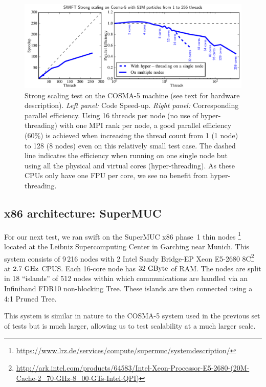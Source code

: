 \documentclass{sig-alternate-05-2015}
\newcommand{\swift}{{\sc swift}\xspace}
\begin{document}
\begin{figure}
\centering
\includegraphics[width=\textwidth]{Figures/scalingCosma}
\caption{Strong scaling test on the COSMA-5 machine (see text for hardware
  description). \textit{Left panel:} Code Speed-up. \textit{Right panel:}
  Corresponding parallel efficiency.  Using 16 threads per node (no use of
  hyper-threading) with one MPI rank per node, a good parallel efficiency (60\%)
  is achieved when increasing the thread count from 1 (1 node) to 128 (8 nodes)
  even on this relatively small test case. The dashed line indicates the
  efficiency when running on one single node but using all the physical and
  virtual cores (hyper-threading). As these CPUs only have one FPU per core, we
  see no benefit from hyper-threading.
  \label{fig:cosma}}
\end{figure}



\subsection{x86 architecture: SuperMUC}

For our next test, we ran \swift on the SuperMUC x86 phase~1 thin
nodes \footnote{\url{https://www.lrz.de/services/compute/supermuc/systemdescription/}}
located at the Leibniz Supercomputing Center in Garching near Munich. This
system consists of 9\,216 nodes with 2 Intel Sandy Bridge-EP Xeon E5-2680
8C\footnote{\url{http://ark.intel.com/products/64583/Intel-Xeon-Processor-E5-2680-(20M-Cache-2_70-GHz-8_00-GTs-Intel-QPI)}}
at $2.7~\rm{GHz}$ CPUS. Each 16-core node has $32~\rm{GByte}$ of RAM.
The nodes are split in 18
``islands'' of 512 nodes within which communications are handled via an
Infiniband FDR10 non-blocking Tree. These islands are then connected using a 4:1
Pruned Tree.

This system is similar in nature to the COSMA-5 system used in the previous set
of tests but is much larger, allowing us to test scalability at a much larger
scale.
\end{document}
